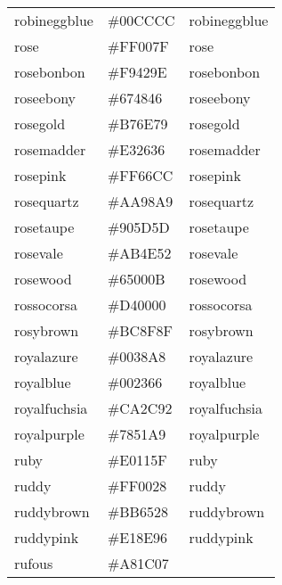 \documentclass[
]{article}
\begin{document}
\begin{longtable}[]{@{}lll@{}}
robineggblue & \colorbox[rgb]{0.0,0.8,0.8}{\#00CCCC} &
\textcolor[rgb]{0.0,0.8,0.8}{robineggblue          }\tabularnewline
rose & \colorbox[rgb]{1.0,0.0,0.5}{\#FF007F} &
\textcolor[rgb]{1.0,0.0,0.5}{rose                  }\tabularnewline
rosebonbon & \colorbox[rgb]{0.98,0.26,0.62}{\#F9429E} &
\textcolor[rgb]{0.98,0.26,0.62}{rosebonbon            }\tabularnewline
roseebony & \colorbox[rgb]{0.4,0.3,0.28}{\#674846} &
\textcolor[rgb]{0.4,0.3,0.28}{roseebony             }\tabularnewline
rosegold & \colorbox[rgb]{0.72,0.43,0.47}{\#B76E79} &
\textcolor[rgb]{0.72,0.43,0.47}{rosegold              }\tabularnewline
rosemadder & \colorbox[rgb]{0.82,0.1,0.26}{\#E32636} &
\textcolor[rgb]{0.89,0.15,0.21}{rosemadder            }\tabularnewline
rosepink & \colorbox[rgb]{1.0,0.4,0.8}{\#FF66CC} &
\textcolor[rgb]{1.0,0.4,0.8}{rosepink              }\tabularnewline
rosequartz & \colorbox[rgb]{0.67,0.6,0.66}{\#AA98A9} &
\textcolor[rgb]{0.67,0.6,0.66}{rosequartz            }\tabularnewline
rosetaupe & \colorbox[rgb]{0.56,0.36,0.36}{\#905D5D} &
\textcolor[rgb]{0.56,0.36,0.36}{rosetaupe             }\tabularnewline
rosevale & \colorbox[rgb]{0.67,0.31,0.32}{\#AB4E52} &
\textcolor[rgb]{0.67,0.31,0.32}{rosevale              }\tabularnewline
rosewood & \colorbox[rgb]{0.4,0.0,0.04}{\#65000B} &
\textcolor[rgb]{0.4,0.0,0.04}{rosewood              }\tabularnewline
rossocorsa & \colorbox[rgb]{0.83,0.0,0.0}{\#D40000} &
\textcolor[rgb]{0.83,0.0,0.0}{rossocorsa            }\tabularnewline
rosybrown & \colorbox[rgb]{0.74,0.56,0.56}{\#BC8F8F} &
\textcolor[rgb]{0.74,0.56,0.56}{rosybrown             }\tabularnewline
royalazure & \colorbox[rgb]{0.0,0.22,0.66}{\#0038A8} &
\textcolor[rgb]{0.0,0.22,0.66}{royalazure            }\tabularnewline
royalblue & \colorbox[rgb]{0.0,0.14,0.4}{\#002366} &
\textcolor[rgb]{0.0,0.14,0.4}{royalblue             }\tabularnewline
royalfuchsia & \colorbox[rgb]{0.79,0.17,0.57}{\#CA2C92} &
\textcolor[rgb]{0.79,0.17,0.57}{royalfuchsia          }\tabularnewline
royalpurple & \colorbox[rgb]{0.47,0.32,0.66}{\#7851A9} &
\textcolor[rgb]{0.47,0.32,0.66}{royalpurple           }\tabularnewline
ruby & \colorbox[rgb]{0.88,0.07,0.37}{\#E0115F} &
\textcolor[rgb]{0.88,0.07,0.37}{ruby                  }\tabularnewline
ruddy & \colorbox[rgb]{1.0,0.0,0.16}{\#FF0028} &
\textcolor[rgb]{1.0,0.0,0.16}{ruddy                 }\tabularnewline
ruddybrown & \colorbox[rgb]{0.73,0.4,0.16}{\#BB6528} &
\textcolor[rgb]{0.73,0.4,0.16}{ruddybrown            }\tabularnewline
ruddypink & \colorbox[rgb]{0.88,0.56,0.59}{\#E18E96} &
\textcolor[rgb]{0.88,0.56,0.59}{ruddypink             }\tabularnewline
rufous & \colorbox[rgb]{0.66,0.11,0.03}{\#A81C07} &

\end{longtable}
\end{document}
